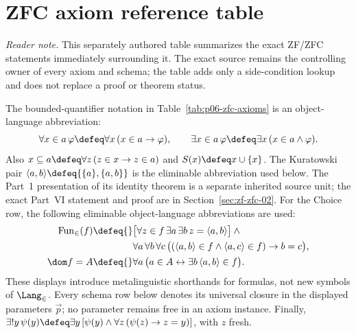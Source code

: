 
\section*{ZFC axiom reference table}
\noindent\textit{Reader note.}  This separately authored table summarizes the
exact ZF/ZFC statements immediately surrounding it.  The exact source remains
the controlling owner of every axiom and schema; the table adds only a
side-condition lookup and does not replace a proof or theorem status.

The bounded-quantifier notation in Table~\ref{tab:p06-zfc-axioms} is an
object-language abbreviation:
\[
 \forall x\in a\,\varphi\defeq\forall x\,(x\in a\to\varphi),
 \qquad
 \exists x\in a\,\varphi\defeq\exists x\,(x\in a\land\varphi).
\]
Also
\(x\subseteq a\defeq\forall z\,(z\in x\to z\in a)\) and
\(S(x)\defeq x\cup\{x\}\).  The Kuratowski pair
\(\langle a,b\rangle\defeq\{\{a\},\{a,b\}\}\) is the eliminable abbreviation
used below.  The Part~1 presentation of its identity theorem is a separate
inherited source unit; the exact Part~VI statement and proof are in
Section~\ref{sec:zf-zfc-02}.  For the Choice row, the
following eliminable object-language abbreviations are used:
\[
\begin{aligned}
 \operatorname{Fun}_{\in}(f)\defeq{}&
   \bigl[\forall z\in f\,\exists a\,\exists b\,
          z=\langle a,b\rangle\bigr]\land{}\\
 &\forall a\,\forall b\,\forall c\,
   \bigl((\langle a,b\rangle\in f\land
          \langle a,c\rangle\in f)\to b=c\bigr),\\
 \dom f=A\defeq{}&
   \forall a\,
   \bigl(a\in A\leftrightarrow
         \exists b\,\langle a,b\rangle\in f\bigr).
\end{aligned}
\]
These displays introduce metalinguistic shorthands for formulas, not new
symbols of \(\Lang_{\in}\).  Every schema row below denotes its universal
closure in the displayed parameters \(\vec p\); no parameter remains free in
an axiom instance.  Finally,
\(\exists!y\,\psi(y)\defeq
\exists y\,[\psi(y)\land\forall z\,(\psi(z)\to z=y)]\), with \(z\) fresh.

